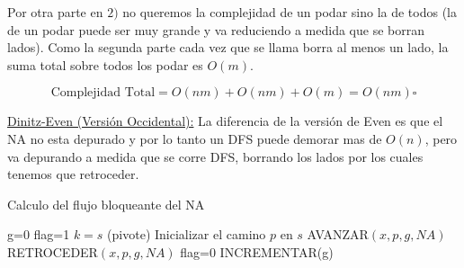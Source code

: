 \documentclass[12pt,a4paper]{article}
\begin{document}
Por otra parte en $2)$ no queremos la complejidad de un podar sino la de todos 
(la de un podar puede ser muy grande y va reduciendo a medida que se borran lados).
Como la segunda parte cada vez que se llama borra al menos un lado, la suma total 
sobre todos los podar es $O(m)$.

$$\text{Complejidad Total} = O(nm) + O(nm) + O(m) = O(nm) \square$$

\underline{Dinitz-Even (Versión Occidental):} La diferencia de la versión 
de Even es que el NA no esta depurado y por lo tanto un DFS puede demorar mas de 
$O(n)$, pero va depurando a medida que se corre DFS, borrando los lados por los 
cuales tenemos que retroceder.
\newpage
\begin{algorithm}
    \caption{Calculo del flujo bloqueante del NA}
    \begin{algorithmic}[1]
        \State g=0
        \State flag=1
            \State $k = s$ (pivote)
            \State Inicializar el camino $p$ en $s$
                 AVANZAR$(x,p,g,NA)$
                 RETROCEDER$(x,p,g,NA)$
                \Else flag=0
                \EndIf
                 INCREMENTAR(g)
                \EndIf
            \EndWhile
        \EndWhile
    \end{algorithmic}
\end{algorithm}
\end{document}
